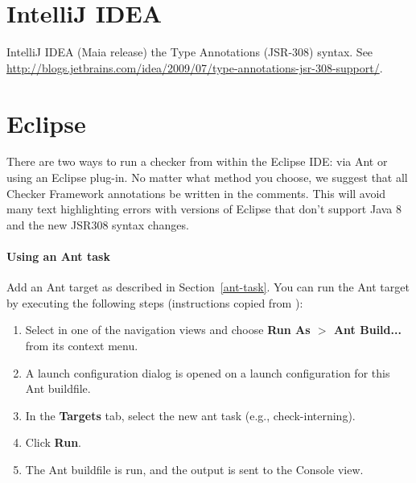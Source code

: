 

\section{IntelliJ IDEA\label{intellij}}

IntelliJ IDEA (Maia release)
the Type Annotations (JSR-308) syntax.
See \url{http://blogs.jetbrains.com/idea/2009/07/type-annotations-jsr-308-support/}.

\section{Eclipse\label{eclipse}}

There are two ways to run a checker from within the Eclipse IDE:  via Ant
or using an Eclipse plug-in.  No matter what method you choose, we suggest that
all Checker Framework annotations be written in the comments.  This will avoid many
text highlighting errors with versions of Eclipse that don't support Java 8 and the
new JSR308 syntax changes.

\paragraph{Using an Ant task}

Add an Ant target as described in Section~\ref{ant-task}.  You can
run the Ant target by executing the following steps
(instructions copied from
):

\begin{enumerate}

\item
  Select  in one of the navigation views and choose
  {\bf Run As $>$ Ant Build...} from its context menu.

\item
  A launch configuration dialog is opened on a launch configuration
  for this Ant buildfile.

\item
  In the {\bf Targets} tab, select the new ant task (e.g., check-interning).

\item
  Click {\bf Run}.

\item
  The Ant buildfile is run, and the output is sent to the Console view.

\end{enumerate}

